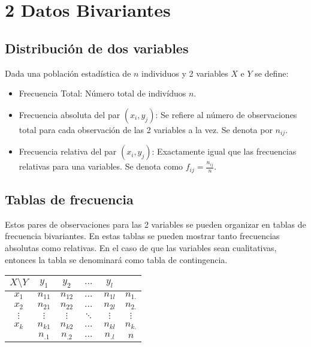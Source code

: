 \documentclass[10pt,a4paper]{book}
\begin{document}
\chapter*{\color{blue}\textbf{2} \color{black} Datos Bivariantes}
\setcounter{section}{0}
\section{Distribución de dos variables}
Dada una población estadística de $n$ individuos y 2 variables $X$ e $Y$ se define:
\begin{itemize}
	\item Frecuencia Total: Número total de indivíduos $n$.
	\item Frecuencia absoluta del par $(x_i, y_j)$: Se refiere al número de observaciones total para cada observación de las 2 variables a la vez. Se denota por $n_{ij}$.
	\item Frecuencia relativa del par $(x_i, y_j)$: Exactamente igual que las frecuencias relativas para una variables. Se denota como $f_{ij} = \frac{n_{ij}}{n}$.
\end{itemize}

\section{Tablas de frecuencia}
\begin{minipage}[h]{0.5\textwidth}
\setlength{\parindent}{1.5em} \indent Estos pares de observaciones para las 2 variables se pueden organizar en tablas de frecuencia bivariantes.
En estas tablas se pueden mostrar tanto frecuencias absolutas como relativas. En el caso de que las variables sean cualitativas, entonces la tabla se denominará como tabla de contingencia.
\end{minipage}
\begin{minipage}[h]{0.4\textwidth}
\begin{center}
\begin{tabular}{c||c|c|c|c||c}
	$X\setminus Y$ & $y_1$ & $y_2$ & $\hdots$ & $y_l$ & \\
	\hline \hline
	$x_1$ & $n_{11}$ & $n_{12}$ & $\hdots$ & $n_{1l}$ & $n_{1.}$ \\
	\hline
	$x_2$ & $n_{21}$ & $n_{22}$ & $\hdots$ & $n_{2l}$ & $n_{2.}$ \\
	\hline
	$\vdots$ & $\vdots$ & $\vdots$ & $\ddots$ & $\vdots$ & $\vdots$ \\
	\hline
	$x_k$ & $n_{k1}$ & $n_{k2}$ & $\hdots$ & $n_{kl}$ & $n_{k.}$ \\
	\hline\hline
	 	& $n_{.1}$ & $n_{.2}$ & $\hdots$ & $n_{.l}$ & $n$ \\
\end{tabular}
\end{center}
\end{minipage}
\end{document}
